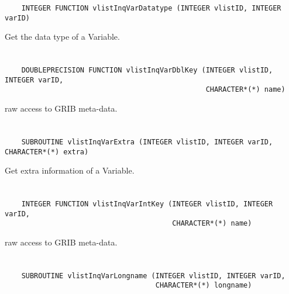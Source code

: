 \begin{verbatim}
    INTEGER FUNCTION vlistInqVarDatatype (INTEGER vlistID, INTEGER varID)
\end{verbatim}

Get the data type of a Variable.


\section*{\tt {}}

\begin{verbatim}
    DOUBLEPRECISION FUNCTION vlistInqVarDblKey (INTEGER vlistID, INTEGER varID,
                                                CHARACTER*(*) name)
\end{verbatim}

raw access to GRIB meta-data.


\section*{\tt {}}

\begin{verbatim}
    SUBROUTINE vlistInqVarExtra (INTEGER vlistID, INTEGER varID, CHARACTER*(*) extra)
\end{verbatim}

Get extra information of a Variable.


\section*{\tt {}}

\begin{verbatim}
    INTEGER FUNCTION vlistInqVarIntKey (INTEGER vlistID, INTEGER varID,
                                        CHARACTER*(*) name)
\end{verbatim}

raw access to GRIB meta-data.


\section*{\tt {}}

\begin{verbatim}
    SUBROUTINE vlistInqVarLongname (INTEGER vlistID, INTEGER varID,
                                    CHARACTER*(*) longname)
\end{verbatim}

